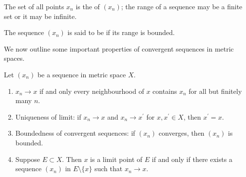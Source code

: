 \begin{definition}
The set of all points $x_n$ is the  of $(x_n)$; the range of a sequence may be a finite set or it may be infinite.

The sequence $(x_n)$ is said to be  if its range is bounded.
\end{definition}

We now outline some important properties of convergent sequences in metric spaces.

\begin{proposition}
Let $(x_n)$ be a sequence in metric space $X$.
\begin{enumerate}[label=(\roman*)]
\item $x_n\to x$ if and only every neighbourhood of $x$ contains $x_n$ for all but finitely many $n$.
\item Uniqueness of limit: if $x_n\to x$ and $x_n\to x^\prime$ for $x,x^\prime\in X$, then $x^\prime=x$.
\item Boundedness of convergent sequences: if $(x_n)$ converges, then $(x_n)$ is bounded.
\item Suppose $E\subset X$. Then $x$ is a limit point of $E$ if and only if there exists a sequence $(x_n)$ in $E\setminus\{x\}$ such that $x_n\to x$.
\end{enumerate}
\end{proposition}

